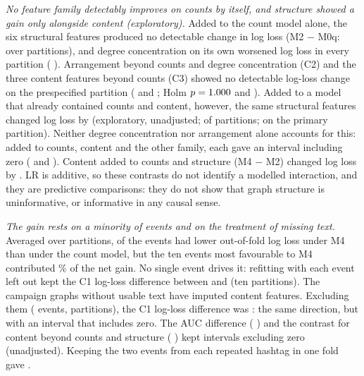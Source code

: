 \documentclass[conference]{IEEEtran}
\begin{document}
\emph{No feature family detectably improves on counts by itself, and structure showed a gain only alongside content (exploratory).} Added to the count model alone, the six structural features produced no detectable change in log loss (M2 $-$ M0q: \RTwStructLL{} \RTwStructLLCI{} over \RNPartitions{} partitions), and degree concentration on its own worsened log loss in every partition (\RTwEOneLL{} \RTwEOneLLCI). Arrangement beyond counts and degree concentration (C2) and the three content features beyond counts (C3) showed no detectable log-loss change on the prespecified partition (\RCTwoLL{} \RCTwoLLCI{} and \RCThreeLL{} \RCThreeLLCI; Holm $p=1.000$ and \RCThreeLLHolm). Added to a model that already contained counts and content, however, the same structural features changed log loss by \RTwETwoLL{} \RTwETwoLLCI{} (exploratory, unadjusted; \RTwETwoFav{} of \RNPartitions{} partitions; \RETwoLL{} \RETwoLLCI{} on the primary partition). Neither degree concentration nor arrangement alone accounts for this: added to counts, content and the other family, each gave an interval including zero (\RTwDegGivenLLCI{} and \RTwArrGivenLLCI). Content added to counts and structure (M4 $-$ M2) changed log loss by \RTwEThreeLL{} \RTwEThreeLLCI. LR is additive, so these contrasts do not identify a modelled interaction, and they are predictive comparisons: they do not show that graph structure is uninformative, or informative in any causal sense.

\emph{The gain rests on a minority of events and on the treatment of missing text.} Averaged over partitions, \RTwEventsImproved{} of the \RNEvents{} events had lower out-of-fold log loss under M4 than under the count model, but the ten events most favourable to M4 contributed \RTopTenShare\% of the net gain. No single event drives it: refitting with each event left out kept the C1 log-loss difference between \RLoeoMin{} and \RLoeoMax{} (ten partitions). The \RNoTextEvents{} campaign graphs without usable text have imputed content features. Excluding them (\RNoTextN{} events, \RNPartitions{} partitions), the C1 log-loss difference was \RNoTextCOneLL{} \RNoTextCOneLLCI: the same direction, but with an interval that includes zero. The AUC difference (\RNoTextCOneAUC{} \RNoTextCOneAUCCI) and the contrast for content beyond counts and structure (\RNoTextEThreeLL{} \RNoTextEThreeLLCI) kept intervals excluding zero (unadjusted). Keeping the two events from each repeated hashtag in one fold gave \RGroupedCOneLL{} \RGroupedCOneLLCI.
\end{document}
